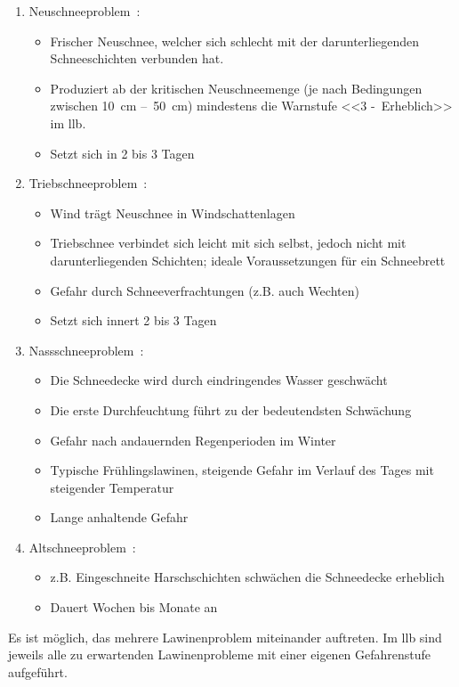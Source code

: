 \begin{enumerate}
  \item Neuschneeproblem~\cite{harveyrhynerschweizerlawinenkunde}\cite{achtunglawine}:
  \begin{itemize}
    \item Frischer Neuschnee, welcher sich schlecht mit der darunterliegenden Schneeschichten verbunden hat. 
    \item Produziert ab der kritischen Neuschneemenge (je nach Bedingungen zwischen \qty{10}{cm} --~\qty{50}{cm}) mindestens die Warnstufe <<3 -~Erheblich>> im \acrfull{llb}.\@
    \item Setzt sich in 2 bis 3 Tagen
  \end{itemize}
  \item Triebschneeproblem~\cite{harveyrhynerschweizerlawinenkunde}\cite{achtunglawine}:
  \begin{itemize}
    \item Wind trägt Neuschnee in Windschattenlagen
    \item Triebschnee verbindet sich leicht mit sich selbst, jedoch nicht mit darunterliegenden Schichten; ideale Voraussetzungen für ein Schneebrett
    \item Gefahr durch Schneeverfrachtungen (z.B. auch Wechten)
    \item Setzt sich innert 2 bis 3 Tagen
  \end{itemize}
  \item Nassschneeproblem~\cite{harveyrhynerschweizerlawinenkunde}\cite{achtunglawine}:
  \begin{itemize}
    \item Die Schneedecke wird durch eindringendes Wasser geschwächt
    \item Die erste Durchfeuchtung führt zu der bedeutendsten Schwächung
    \item Gefahr nach andauernden Regenperioden im Winter
    \item Typische Frühlingslawinen, steigende Gefahr im Verlauf des Tages mit steigender Temperatur
    \item Lange anhaltende Gefahr
  \end{itemize}
  \item Altschneeproblem~\cite{harveyrhynerschweizerlawinenkunde}\cite{achtunglawine}:
  \begin{itemize}
    \item z.B. Eingeschneite Harschschichten schwächen die Schneedecke erheblich
    \item Dauert Wochen bis Monate an
  \end{itemize}
\end{enumerate}
Es ist möglich, das mehrere Lawinenproblem miteinander auftreten. Im \gls{llb} sind jeweils alle zu erwartenden Lawinenprobleme mit einer eigenen Gefahrenstufe aufgeführt.~\cite{slfTypischeLawinenprobleme}

